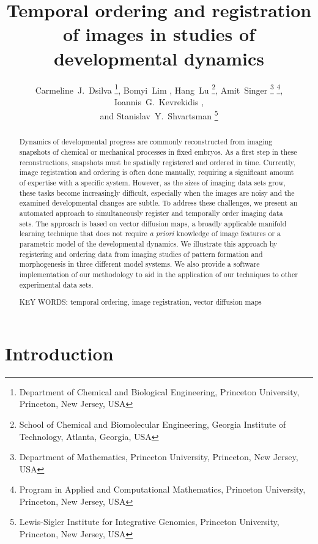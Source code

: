 \documentclass[twocolumn, 10pt]{article}
\title{Temporal ordering and registration of images in studies of developmental dynamics}
\author{Carmeline~J.~Dsilva \thanks{Department of Chemical and Biological Engineering, Princeton University, Princeton, New Jersey, USA},
Bomyi~Lim \footnotemark[1],
Hang~Lu \thanks{School of Chemical and Biomolecular Engineering, Georgia Institute of Technology, Atlanta, Georgia, USA},
Amit~Singer \thanks{Department of Mathematics, Princeton University, Princeton, New Jersey, USA} \thanks{Program in Applied and Computational Mathematics, Princeton University, Princeton, New Jersey, USA}, Ioannis~G.~Kevrekidis \footnotemark[1] \footnotemark[4] ,\\ and
Stanislav~Y.~Shvartsman \footnotemark[1] \thanks{Lewis-Sigler Institute for Integrative Genomics, Princeton University, Princeton, New Jersey, USA}}
\date{}
\begin{document}
\maketitle

\begin{abstract}

Dynamics of developmental progress are commonly reconstructed from imaging snapshots of chemical or mechanical processes in fixed embryos.
%
As a first step in these reconstructions, snapshots must be spatially registered and ordered in time.
%
Currently, image registration and ordering is often done manually, requiring a significant amount of expertise with a specific system.
%
However, as the sizes of imaging data sets grow, these tasks become increasingly difficult, especially when the images are noisy and the examined developmental changes are subtle.
%
To address these challenges, we present an automated approach to simultaneously register and temporally order imaging data sets.
%
The approach is based on vector diffusion maps, a broadly applicable manifold learning technique that does not require \textit{a priori} knowledge of image features or a parametric model of the developmental dynamics.
%
We illustrate this approach by registering and ordering data from imaging studies of pattern formation and morphogenesis in three different model systems.
%
We also provide a software implementation of our methodology to aid in the application of our techniques to other experimental data sets.
\vspace{1em}

\noindent
KEY WORDS: temporal ordering, image registration, vector diffusion maps

\end{abstract}



\section*{Introduction}
\end{document}
